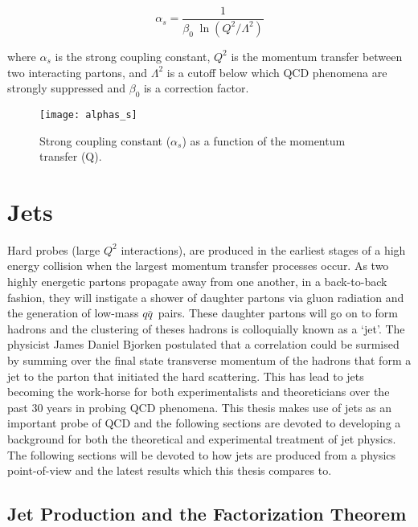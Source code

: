 \begin{equation}
\alpha_{s} = \frac{1}{\beta_{0} \; \ln(Q^{2}/\Lambda^{2} )}
\label{eq:alpha_s}
\end{equation}

\noindent
where $\alpha_{s}$ is the strong coupling constant, $Q^{2}$ is the momentum transfer between two interacting partons, and $\Lambda^{2}$ is a cutoff below which QCD phenomena are strongly suppressed and $\beta_{0}$ is a correction factor.

\begin{figure}[h]
\texttt{[image: alphas\_s]}
\centering
\caption{Strong coupling constant ($\alpha_{s}$) as a function of the momentum transfer (Q)\cite{CMS:2014mna}.}
\label{fig:as}
\end{figure}

\section{Jets}

Hard probes (large $Q^{2}$ interactions), are produced in the earliest stages of a high energy collision when the largest momentum transfer processes occur.  As two highly energetic partons propagate away from one another, in a back-to-back fashion, they will instigate a shower of daughter partons via gluon radiation and the generation of low-mass $q \bar{q}$\, pairs.  These daughter partons will go on to form hadrons and the clustering of theses hadrons is colloquially known as a `jet'.  The physicist James Daniel Bjorken postulated that a correlation could be surmised by summing over the final state transverse momentum of the hadrons that form a jet to the parton that initiated the hard scattering\cite{PhysRev.179.1547}\cite{Bjorken:1973kd}.  This has lead to jets becoming the work-horse for both experimentalists and theoreticians over the past 30 years in probing QCD phenomena.  This thesis makes use of jets as an important probe of QCD and the following sections are devoted to developing a background for both the theoretical and experimental treatment of jet physics.  The following sections will be devoted to how jets are produced from a physics point-of-view and the latest results which this thesis compares to.

\subsection{Jet Production and the Factorization Theorem}

